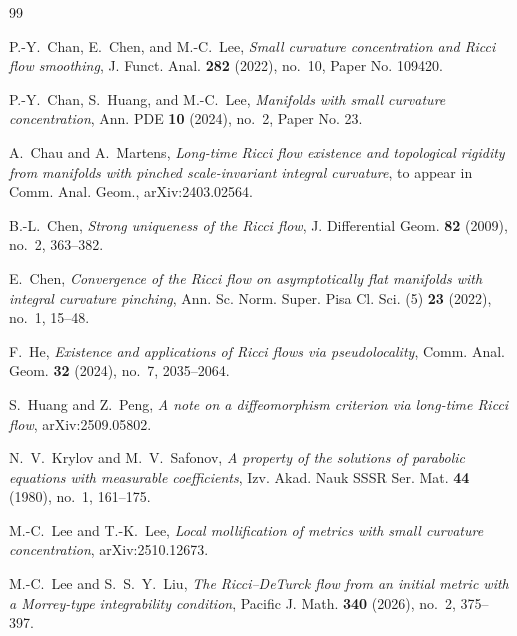 \documentclass{amsart}
\theoremstyle{definition}
\begin{document}
\begin{thebibliography}{99}

P.-Y.~Chan, E.~Chen, and M.-C.~Lee,
\textit{Small curvature concentration and Ricci flow smoothing},
J. Funct. Anal. \textbf{282} (2022), no.~10, Paper No. 109420.

P.-Y.~Chan, S.~Huang, and M.-C.~Lee,
\textit{Manifolds with small curvature concentration},
Ann. PDE \textbf{10} (2024), no.~2, Paper No. 23.


A.~Chau and A.~Martens,
\textit{Long-time Ricci flow existence and topological rigidity from manifolds with pinched scale-invariant integral curvature},
to appear in Comm. Anal. Geom., arXiv:2403.02564.

B.-L.~Chen,
\textit{Strong uniqueness of the Ricci flow},
J. Differential Geom. \textbf{82} (2009), no.~2, 363--382.

E.~Chen,
\textit{Convergence of the Ricci flow on asymptotically flat manifolds with integral curvature pinching},
Ann. Sc. Norm. Super. Pisa Cl. Sci. (5) \textbf{23} (2022), no.~1, 15--48.

F.~He,
\textit{Existence and applications of Ricci flows via pseudolocality},
Comm. Anal. Geom. \textbf{32} (2024), no.~7, 2035--2064.


S.~Huang and Z.~Peng,
\textit{A note on a diffeomorphism criterion via long-time Ricci flow},
arXiv:2509.05802.

N.~V.~Krylov and M.~V.~Safonov,
\textit{A property of the solutions of parabolic equations with measurable coefficients},
Izv. Akad. Nauk SSSR Ser. Mat. \textbf{44} (1980), no.~1, 161--175.

M.-C.~Lee and T.-K.~Lee,
\textit{Local mollification of metrics with small curvature concentration},
arXiv:2510.12673.

M.-C.~Lee and S.~S.~Y.~Liu,
\textit{The Ricci--DeTurck flow from an initial metric with a Morrey-type integrability condition},
Pacific J. Math. \textbf{340} (2026), no.~2, 375--397.


\end{thebibliography}
\end{document}

